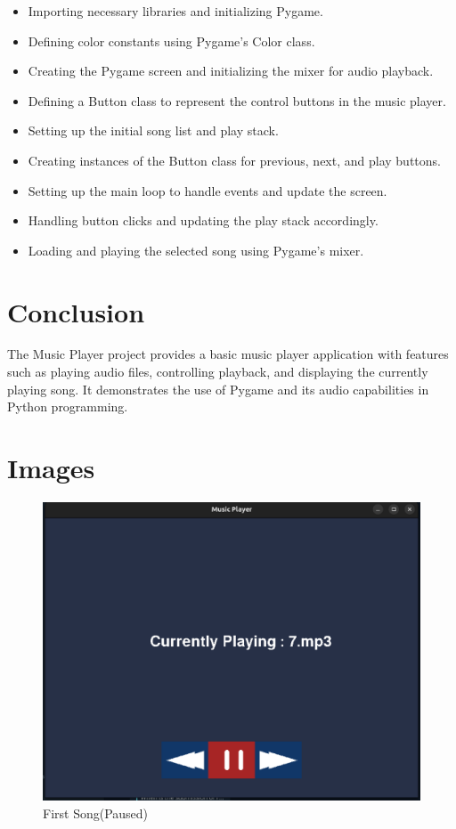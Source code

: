 \documentclass[journal,12pt,twocolumn]{IEEEtran}
\begin{document}
\begin{itemize}
\item Importing necessary libraries and initializing Pygame.
\item Defining color constants using Pygame's Color class.
\item Creating the Pygame screen and initializing the mixer for audio playback.
\item Defining a Button class to represent the control buttons in the music player.
\item Setting up the initial song list and play stack.
\item Creating instances of the Button class for previous, next, and play buttons.
\item Setting up the main loop to handle events and update the screen.
\item Handling button clicks and updating the play stack accordingly.
\item Loading and playing the selected song using Pygame's mixer.
\end{itemize}

\section{Conclusion}
The Music Player project provides a basic music player application with features such as playing audio files, controlling playback, and displaying the currently playing song. It demonstrates the use of Pygame and its audio capabilities in Python programming.


\section{Images}
\begin{figure}[h!]
        \includegraphics[scale = 0.25]{figs/img1}
        \caption{First Song(Paused)}
        \label{fig:1}
\end{figure}
\end{document}
